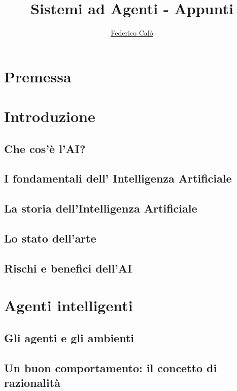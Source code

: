 \documentclass[a4paper]{extarticle}
\title{Sistemi ad Agenti - Appunti}
\author{\href{http://www.federicocalo.dev}{Federico Calò} }
\date{}
\begin{document}
\maketitle
\newpage
\tableofcontents
\voffset -30pt

\newpage

\section*{Premessa}

\newpage

\section{Introduzione}

\subsection{Che cos'è l'AI?}

\subsection{I fondamentali dell' Intelligenza Artificiale}

\subsection{La storia dell'Intelligenza Artificiale}

\subsection{Lo stato dell'arte}

\subsection{Rischi e benefici dell'AI}

\newpage


\section{Agenti intelligenti}

\subsection{Gli agenti e gli ambienti}

\subsection{Un buon comportamento: il concetto di razionalità}
\end{document}
